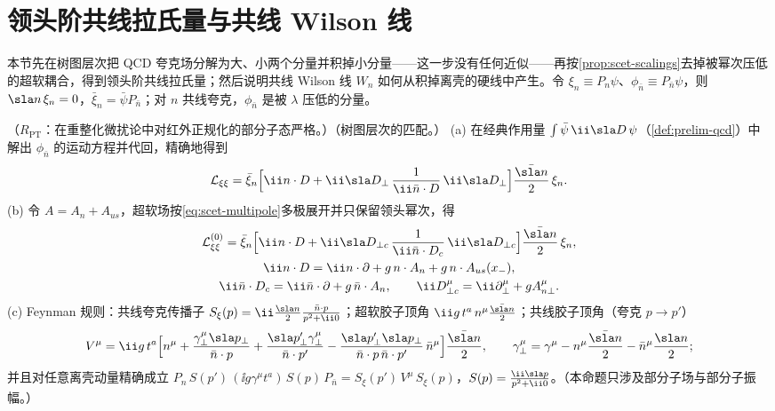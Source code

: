 \section{领头阶共线拉氏量与共线 Wilson 线}\label{sec:scet-lagrangian}

本节先在树图层次把 QCD 夸克场分解为大、小两个分量并积掉小分量——这一步没有任何近似——再按\cref{prop:scet-scalings}去掉被幂次压低的超软耦合，得到领头阶共线拉氏量；然后说明共线 Wilson 线 $W_n$ 如何从积掉离壳的硬线中产生。令 $\xi_n\equiv P_n\psi$、$\phi_{\bar n}\equiv P_{\bar n}\psi$，则 $\sla n\,\xi_n=0$，$\bar\xi_n=\bar\psi P_{\bar n}$；对 $n$ 共线夸克，$\phi_{\bar n}$ 是被 $\lambda$ 压低的分量。

\begin{proposition}\label{prop:scet-lagrangian}
（$R_{\mathrm{PT}}$：在重整化微扰论中对红外正规化的部分子态严格。）（树图层次的匹配。）
(a) 在经典作用量 $\int\bar\psi\,\ii\sla D\,\psi$（\cref{def:prelim-qcd}）中解出 $\phi_{\bar n}$ 的运动方程并代回，精确地得到
\begin{equation}\label{eq:scet-Lxixi-exact}
\mathcal L_{\xi\xi}=\bar\xi_n\Big[\ii n\cdot D+\ii\sla D_\perp\,\frac{1}{\ii\bar n\cdot D}\,\ii\sla D_\perp\Big]\frac{\bar{\sla n}}{2}\,\xi_n .
\end{equation}
(b) 令 $A=A_n+A_{us}$，超软场按\cref{eq:scet-multipole}多极展开并只保留领头幂次，得
\begin{equation}\label{eq:scet-L0xi}
\begin{gathered}
\mathcal L^{(0)}_{\xi\xi}=\bar\xi_n\Big[\ii n\cdot D+\ii\sla D_{\perp c}\,\frac{1}{\ii\bar n\cdot D_c}\,\ii\sla D_{\perp c}\Big]\frac{\bar{\sla n}}{2}\,\xi_n,\\
\ii n\cdot D=\ii n\cdot\partial+g\,n\cdot A_n+g\,n\cdot A_{us}(x_-),\\
\ii\bar n\cdot D_c=\ii\bar n\cdot\partial+g\,\bar n\cdot A_n,\qquad \ii D^\mu_{\perp c}=\ii\partial^\mu_\perp+gA^\mu_{n\perp}.
\end{gathered}
\end{equation}
(c) Feynman 规则：共线夸克传播子 $S_\xi(p)=\ii\frac{\sla n}{2}\frac{\bar n\cdot p}{p^2+\ii0}$；超软胶子顶角 $\ii g\,t^a\,n^\mu\frac{\bar{\sla n}}{2}$；共线胶子顶角（夸克 $p\to p'$）
\begin{equation}\label{eq:scet-collvertex}
V^\mu=\ii g\,t^a\Big[n^\mu+\frac{\gamma_\perp^\mu\sla p_\perp}{\bar n\cdot p}+\frac{\sla p'_\perp\gamma_\perp^\mu}{\bar n\cdot p'}-\frac{\sla p'_\perp\sla p_\perp}{\bar n\cdot p\,\bar n\cdot p'}\,\bar n^\mu\Big]\frac{\bar{\sla n}}{2},\qquad
\gamma_\perp^\mu=\gamma^\mu-n^\mu\frac{\bar{\sla n}}{2}-\bar n^\mu\frac{\sla n}{2};
\end{equation}
并且对任意离壳动量精确成立 $P_n\,S(p')\,(\ii g\gamma^\mu t^a)\,S(p)\,P_{\bar n}=S_\xi(p')\,V^\mu\,S_\xi(p)$，$S(p)=\frac{\ii\sla p}{p^2+\ii0}$。（本命题只涉及部分子场与部分子振幅。）
\end{proposition}

